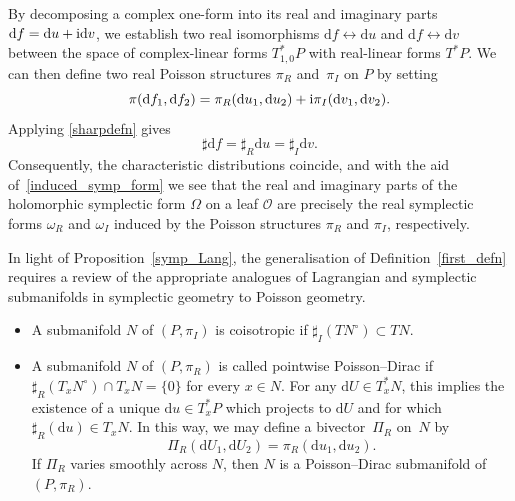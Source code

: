 \documentclass[pdftex]{sigma}
\numberwithin{equation}{section}
\begin{document}
By decomposing a complex one-form into its real and imaginary parts $\mathrm{d}f=\mathrm{d}u+{\rm i}\mathrm{d}v$, we establish two real isomorphisms $\mathrm{d}f\leftrightarrow \mathrm{d}u$ and $\mathrm{d}f\leftrightarrow \mathrm{d}v$ between the space of complex-linear forms $T^*_{1,0}P$ with real-linear forms $T^*P$. We can then define two real Poisson structures $\pi_R$ and~$\pi_I$ on $P$ by setting
\begin{equation*}%
	\pi(\mathrm{d}f_1,\mathrm{d}f_2)=\pi_R(\mathrm{d}u_1,\mathrm{d}u_2)+{\rm i}\pi_I(\mathrm{d}v_1,\mathrm{d}v_2).
\end{equation*}
Applying \eqref{sharpdefn} gives
\begin{equation}\label{sharprelations}
	\sharp \mathrm{d}f=\sharp_R \mathrm{d}u=\sharp_I \mathrm{d}v.
\end{equation}
Consequently, the characteristic distributions coincide, and with the aid of~\eqref{induced_symp_form} we see that the real and imaginary parts of the holomorphic symplectic form $\Omega$ on a leaf $\mathcal{O}$ are precisely the real symplectic forms $\omega_R$ and $\omega_I$ induced by the Poisson structures $\pi_R$ and $\pi_I$, respectively.

In light of Proposition~\ref{symp_Lang}, the generalisation of Definition~\ref{first_defn} requires a review of the appropriate analogues of Lagrangian and symplectic submanifolds in symplectic geometry to Poisson geometry.
\begin{itemize}\itemsep=0pt
	\item A submanifold $N$ of $(P,\pi_I)$ is coisotropic if $\sharp_I(TN^\circ)\subset TN$.
	
	\item A submanifold $N$ of $(P,\pi_R)$ is called pointwise Poisson--Dirac if $\sharp_R(T_xN^\circ)\cap T_xN=\{0\}$ for every $x\in N$. For any $\mathrm{d}U\in T_x^*N$, this implies the existence of a unique $\mathrm{d}u\in T_x^*P$ which projects to $\mathrm{d}U$ and for which $\sharp_R(\mathrm{d}u)\in T_xN$. In this way, we may define a bivector~$\Pi_R$ on~$N$ by
	\begin{equation}
		\label{Bivector}
		\Pi_R(\mathrm{d}U_1,\mathrm{d}U_2)=\pi_R(\mathrm{d}u_1,\mathrm{d}u_2).
	\end{equation}
	If $\Pi_R$ varies smoothly across $N$, then $N$ is a Poisson--Dirac submanifold of $(P,\pi_R)$.
\end{itemize}
\end{document}
